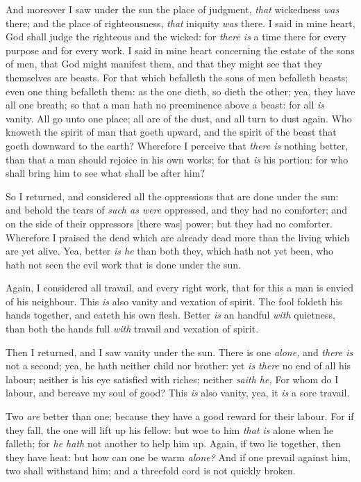 \documentclass[11pt,letterpaper,oneside]{memoir}
\begin{document}
And moreover I saw under the sun the place of judgment, \emph{that} 
wickedness \emph{was} there; and the place of righteousness, \emph{that} 
iniquity \emph{was} there. I said in mine heart, God shall judge the 
righteous and the wicked: for \emph{there is} a time there for every 
purpose and for every work. I said in mine heart concerning the estate 
of the sons of men, that God might manifest them, and that they might 
see that they themselves are beasts. For that which befalleth the sons 
of men befalleth beasts; even one thing befalleth them: as the one 
dieth, so dieth the other; yea, they have all one breath; so that a man 
hath no preeminence above a beast: for all \emph{is} vanity. All go unto 
one place; all are of the dust, and all turn to dust again. Who knoweth 
the spirit of man that goeth upward, and the spirit of the beast that 
goeth downward to the earth? Wherefore I perceive that \emph{there is} 
nothing better, than that a man should rejoice in his own works; for 
that \emph{is} his portion: for who shall bring him to see what shall be 
after him? 

So I returned, and considered all the oppressions that are done under 
the sun: and behold the tears of \emph{such as were} oppressed, and they 
had no comforter; and on the side of their oppressors [there was] power; 
but they had no comforter. Wherefore I praised the dead which are 
already dead more than the living which are yet alive. Yea, better 
\emph{is he} than both they, which hath not yet been, who hath not seen 
the evil work that is done under the sun. 

Again, I considered all travail, and every right work, that for this a 
man is envied of his neighbour. This \emph{is} also vanity and vexation 
of spirit. The fool foldeth his hands together, and eateth his own 
flesh. Better \emph{is} an handful \emph{with} quietness, than both the 
hands full \emph{with} travail and vexation of spirit. 

Then I returned, and I saw vanity under the sun. There is one 
\emph{alone,} and \emph{there is} not a second; yea, he hath neither 
child nor brother: yet \emph{is there} no end of all his labour; neither 
is his eye satisfied with riches; neither \emph{saith he,} For whom do I 
labour, and bereave my soul of good? This \emph{is} also vanity, yea, it 
\emph{is} a sore travail. 

Two \emph{are} better than one; because they have a good reward for 
their labour. For if they fall, the one will lift up his fellow: but woe 
to him \emph{that is} alone when he falleth; for \emph{he hath} not 
another to help him up. Again, if two lie together, then they have heat: 
but how can one be warm \emph{alone? }And if one prevail against him, 
two shall withstand him; and a threefold cord is not quickly broken. 
\end{document}
